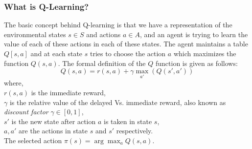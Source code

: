 \documentclass[12pt]{report}
\begin{document}
\subsubsection{What is Q-Learning?} 
The basic concept behind Q-learning is that we have a representation of the environmental states $s \in S$ and actions $a \in A$, and an agent is trying to learn the value of each of these actions in each of these states. The agent maintains a table $Q[s,a]$ and at each state $s$ tries to choose the action $a$ which maximizes the function $Q(s,a)$. The formal definition of the $Q$ function is given as follows:
\begin{equation} \label{q_function}
Q(s,a) = r(s,a) + \gamma \max_{a'}(Q(s',a'))
\end{equation}
where,\\
$r(s,a)$ is the immediate reward,\\
$\gamma$ is the relative value of the delayed Vs. immediate reward, also known as \textit{discount factor} $ \gamma \in [0,1]$,\\
$s'$ is the new state after action $a$ is taken in state $s$,\\
$a,a'$ are the actions in state $s$ and $s'$ respectively.\\
The selected action $\pi(s) = \arg\max_a Q(s,a)$.\\
\pagebreak
\end{document}
